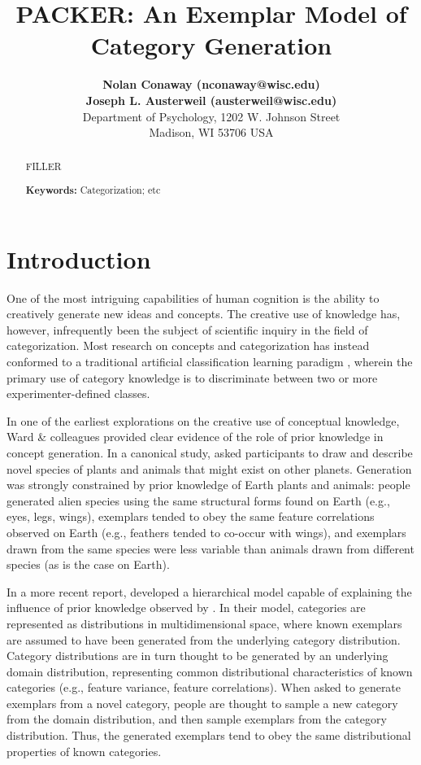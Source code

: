 \documentclass[10pt,letterpaper]{article}
\title{PACKER: An Exemplar Model of Category Generation}
\author{
{ \large \bf Nolan Conaway (nconaway@wisc.edu) } \\
{ \large \bf Joseph L. Austerweil (austerweil@wisc.edu) } \\
Department of Psychology, 1202 W. Johnson Street \\
Madison, WI 53706 USA
}
\begin{document}
\maketitle

\begin{abstract}
FILLER

\textbf{Keywords:} 
Categorization; etc
\end{abstract}

\section{Introduction}

One of the most intriguing capabilities of human cognition is the ability to creatively generate new ideas and concepts. %
The creative use of knowledge has, however, infrequently been the subject of scientific inquiry in the field of categorization. Most research on concepts and categorization has instead conformed to a traditional artificial classification learning paradigm \citep{kurtz2015human}, wherein the primary use of category knowledge is to discriminate between two or more experimenter-defined classes.

In one of the earliest explorations on the creative use of conceptual knowledge, Ward \& colleagues \citep{marsh1999inadvertent,smith1993constraining,ward2002role,ward1994structured} provided clear evidence of the role of prior knowledge in concept generation. In a canonical study, \citet{ward1994structured} asked participants to draw and describe novel species of plants and animals that might exist on other planets. Generation was strongly constrained by prior knowledge of Earth plants and animals: people generated alien species using the same structural forms found on Earth (e.g., eyes, legs, wings), exemplars tended to obey the same feature correlations observed on Earth (e.g., feathers tended to co-occur with wings), and exemplars drawn from the same species were less variable than animals drawn from different species (as is the case on Earth). 


In a more recent report, \citet{jern2013probabilistic} developed a hierarchical model capable of explaining the influence of prior knowledge observed by \citet{ward1994structured}. In their model, categories are represented as distributions in multidimensional space, where known exemplars are assumed to have been generated from the underlying category distribution. Category distributions are in turn thought to be generated by an underlying domain distribution, representing common distributional characteristics of known categories (e.g., feature variance, feature correlations). When asked to generate exemplars from a novel category, people are thought to sample a new category from the domain distribution, and then sample exemplars from the category distribution. Thus, the generated exemplars tend to obey the same distributional properties of known categories. 
\end{document}
